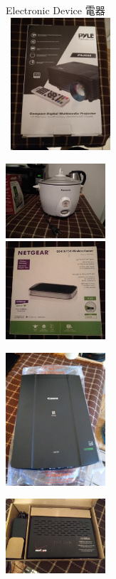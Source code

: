 \documentclass{article}[12pt]
\begin{document}
{\begin{minipage}[t][\textheight-27pt][t]{445pt}
%
Electronic Device 電器\dotfill \\[5pt]
\mbox{ }\hspace{2pt}\includegraphics[width=105pt]{projector_mini.jpg}
\begin{minipage}[b]{105pt}
\includegraphics[width=105pt]{rice_cooker_mini.jpg} \\
\includegraphics[width=105pt]{netgear_wireless_router_mini.jpg} 
\end{minipage} \hspace{-2pt}
\includegraphics[width=105pt]{scanner_mini.jpg}
\begin{minipage}[b]{105pt}
\includegraphics[width=105pt]{verizon_modem01_mini.jpg} \\

\end{minipage}
\end{minipage}}
\end{document}
